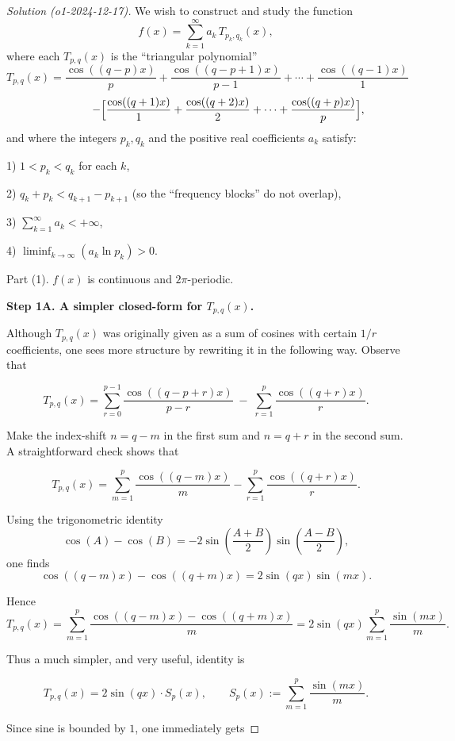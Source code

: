 \documentclass[11pt]{article}
\numberwithin{equation}{section}
\begin{document}
\begin{proof}[Solution (o1-2024-12-17)]

We wish to construct and study the function  
\[
f(x)=\sum_{k=1}^{\infty} a_k\, T_{p_k,q_k}(x),
\]
where each \(T_{p,q}(x)\) is the ``triangular polynomial''
\[
T_{p,q}(x)
= \frac{\cos((q-p)x)}{p} + \frac{\cos((q-p+1)x)}{p-1} + \cdots + \frac{\cos((q-1)x)}{1}
\]
\[
\qquad\qquad
- \Bigl[ \frac{\cos((q+1)x)}{1} + \frac{\cos((q+2)x)}{2} + \cdots + \frac{\cos((q+p)x)}{p} \Bigr],
\]
and where the integers \(p_k, q_k\) and the positive real coefficients \(a_k\) satisfy:

1) \(1 < p_k < q_k\) for each \(k\),  

2) \(q_k + p_k < q_{k+1} - p_{k+1}\)  (so the ``frequency blocks'' do not overlap),  

3) \(\sum_{k=1}^{\infty} a_k < +\infty\),  

4) \(\liminf_{k\to\infty} (a_k \ln p_k) > 0.\)

Part (1).  \(f(x)\) is continuous and \(2\pi\)-periodic.

\hrulefill

\textbf{Step 1A.  A simpler closed-form for \(T_{p,q}(x)\).}

Although \(T_{p,q}(x)\) was originally given as a sum of cosines with certain \(1/r\) coefficients, one sees more structure by rewriting it in the following way. Observe that

\[
T_{p,q}(x)
  = \sum_{r=0}^{p-1} \frac{\cos((q-p+r)x)}{p-r}
    \;-\;
    \sum_{r=1}^{p} \frac{\cos((q+r)x)}{r}.
\]

Make the index-shift \(n=q-m\) in the first sum and \(n=q+r\) in the second sum. A straightforward check shows that

\[
T_{p,q}(x)
= \sum_{m=1}^{p} \frac{\cos((q-m)x)}{m}
  - \sum_{r=1}^{p} \frac{\cos((q+r)x)}{r}.
\]

Using the trigonometric identity
\[
\cos(A)-\cos(B)=-2\sin\!\left(\frac{A+B}{2}\right)\sin\!\left(\frac{A-B}{2}\right),
\]
one finds
\[
\cos((q-m)x)-\cos((q+m)x)=2\sin(qx)\sin(mx).
\]

Hence
\[
T_{p,q}(x)
= \sum_{m=1}^{p} \frac{\cos((q-m)x)-\cos((q+m)x)}{m}
= 2\sin(qx)\sum_{m=1}^{p} \frac{\sin(mx)}{m}.
\]

Thus a much simpler, and very useful, identity is

\[
\tag{$\star$}
T_{p,q}(x)=2\sin(qx)\cdot S_p(x),
\qquad
S_p(x):=\sum_{m=1}^{p} \frac{\sin(mx)}{m}.
\]

Since sine is bounded by \(1\), one immediately gets


\end{proof}
\end{document}

